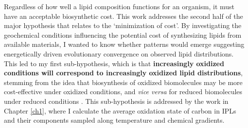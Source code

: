 Regardless of how well a lipid composition functions for an organism, it must have an acceptable biosynthetic cost. This work addresses the second half of the major hypothesis that relates to the `minimization of cost'. By investigating the geochemical conditions influencing the potential cost of synthesizing lipids from available materials, I wanted to know whether patterns would emerge suggesting energetically driven evolutionary convergence on observed lipid distributions. This led to my first sub-hypothesis, which is that \textbf{increasingly oxidized conditions will correspond to increasingly oxidized lipid distributions}, stemming from the idea that biosynthesis of oxidized biomolecules may be more cost-effective under oxidized conditions, and \textit{vice versa} for reduced biomolecules under reduced conditions \citep{amend1998energetics, shock2010potential, dick2011calculation, dick2013metastable}. This sub-hypothesis is addressed by the work in Chapter \ref{ch1}, where I calculate the average oxidation state of carbon in IPLs and their components sampled along temperature and chemical gradients.


